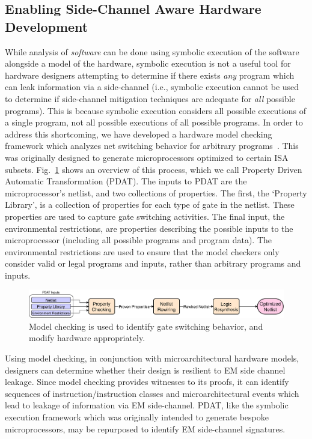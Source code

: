 \color{red}
\subsection{Enabling Side-Channel Aware Hardware Development}
While analysis of \textit{software} can be done using symbolic execution of the
software alongside a model of the hardware, symbolic execution is not a useful
tool for hardware designers attempting to determine if there exists
\textit{any} program which can leak information via a side-channel (i.e.,
symbolic execution cannot be used to determine if side-channel mitigation
techniques are adequate for \textit{all} possible programs).  This is because
symbolic execution considers all possible executions of a single program, not
all possible executions of all possible programs. In order to address this
shortcoming, we have developed a hardware model checking framework which
analyzes net switching behavior for arbitrary programs~\cite{bleier21}. This
was originally designed to generate microprocessors optimized to certain ISA
subsets.  Fig.~\ref{fig:pdat} shows an overview of this process, which we
call Property Driven Automatic Transformation (PDAT).
The inputs to PDAT are the microprocessor's
netlist, and two collections of properties.  The first, the `Property Library',
is a collection of properties for each type of gate in the netlist.  These
properties are used to capture gate switching activities.
The final input, the environmental restrictions, are properties describing
the possible inputs to the microprocessor (including all possible programs
and program data).  The environmental restrictions are used to ensure that
the model checkers only consider valid or legal programs and inputs, rather
than arbitrary programs and inputs.

\begin{figure}
\includegraphics[width=\linewidth]{./figure/PDAT.png}
\caption{\small
    Model checking is used to identify gate switching behavior, and modify
    hardware appropriately.
}
\label{fig:pdat}
\end{figure}

Using model checking, in conjunction with microarchitectural hardware models,
designers can determine whether their design is resilient to EM side channel
leakage.  Since model checking provides witnesses to its proofs, it can
identify sequences of instruction/instruction classes and microarchitectural
events which lead to leakage of information via EM side-channel. PDAT, like the
symbolic execution framework which was originally intended to generate bespoke
microprocessors, may be repurposed to identify EM side-channel signatures.

\color{black}

